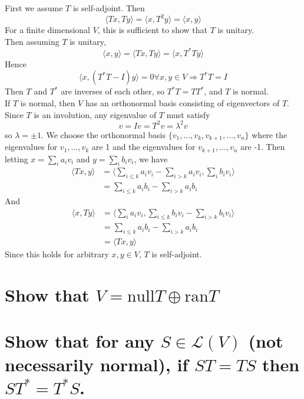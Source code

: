 \documentclass[answers]{exam}
\begin{document}
\begin{questions}
\begin{solution}
	First we assume $T$ is self-adjoint. Then
	$$\langle Tx,Ty \rangle = \langle x,T^2y \rangle = \langle x,y \rangle$$
	For a finite dimensional $V$, this is sufficient to show that $T$ is unitary. \\
	Then assuming $T$ is unitary,
	$$\langle x,y \rangle = \langle Tx,Ty \rangle = \langle x,T^*Ty \rangle$$
	Hence
	$$\langle x,(T^*T-I)y \rangle = 0 \forall x,y \in V \Rightarrow T^*T = I$$
	Then $T$ and $T^*$ are inverses of each other, so $T^*T = TT^*$, and $T$ is normal. \\
	If $T$ is normal, then $V$ has an orthonormal basis consisting of eigenvectors of $T$. Since $T$ is an involution, any eigenvalue of $T$ must satisfy
	$$v = Iv = T^2v = \lambda^2v$$
	so $\lambda = \pm 1$. We choose the orthonormal basis $\{v_1,\dots,v_k,v_{k+1},\dots,v_n\}$ where the eigenvalues for $v_1,\dots,v_k$ are 1 and the eigenvalues for $v_{k+1},\dots,v_n$ are -1. Then letting $x = \sum_i a_iv_i$ and $y = \sum_i b_iv_i$, we have
	\begin{align*}
		\langle Tx,y \rangle &= \langle \sum_{i\leq k} a_iv_i - \sum_{i > k} a_iv_i,\sum_i b_iv_i \rangle \\
				     &= \sum_{i\leq k} a_ib_i - \sum_{i>k} a_ib_i
	\end{align*}
	And
	\begin{align*}
		\langle x,Ty \rangle &= \langle \sum_i a_iv_i, \sum_{i\leq k} b_iv_i - \sum_{i>k} b_iv_i \rangle \\
				     &= \sum_{i\leq k} a_ib_i - \sum_{i>k} a_ib_i \\
				     &= \langle Tx,y \rangle
	\end{align*}
	Since this holds for arbitrary $x,y \in V$, $T$ is self-adjoint.
\end{solution}


\begin{parts}
	\part{Show that $V = \text{null}T \oplus \text{ran}T$}
	\part{Show that for any $S \in \mathcal L(V)$ (not necessarily normal), if $ST = TS$ then $ST^* = T^*S$.}
\end{parts}


\end{questions}
\end{document}
